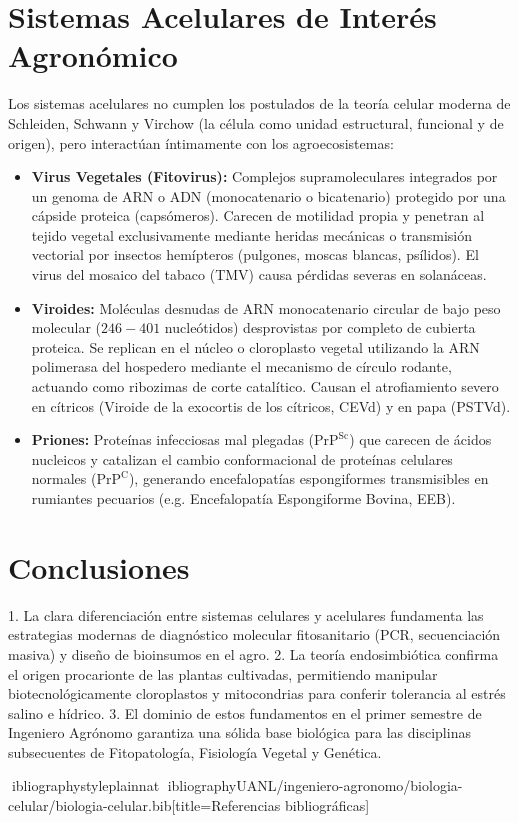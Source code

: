 \documentclass[spanish,letterpaper,oneside]{article}
\begin{document}
\section{Sistemas Acelulares de Interés Agronómico}
Los sistemas acelulares no cumplen los postulados de la teoría celular moderna de Schleiden, Schwann y Virchow (la célula como unidad estructural, funcional y de origen), pero interactúan íntimamente con los agroecosistemas:
\begin{itemize}
    \item \textbf{Virus Vegetales (Fitovirus):} Complejos supramoleculares integrados por un genoma de ARN o ADN (monocatenario o bicatenario) protegido por una cápside proteica (capsómeros). Carecen de motilidad propia y penetran al tejido vegetal exclusivamente mediante heridas mecánicas o transmisión vectorial por insectos hemípteros (pulgones, moscas blancas, psílidos). El virus del mosaico del tabaco (TMV) causa pérdidas severas en solanáceas.
    \item \textbf{Viroides:} Moléculas desnudas de ARN monocatenario circular de bajo peso molecular ($246-401$ nucleótidos) desprovistas por completo de cubierta proteica. Se replican en el núcleo o cloroplasto vegetal utilizando la ARN polimerasa del hospedero mediante el mecanismo de círculo rodante, actuando como ribozimas de corte catalítico. Causan el atrofiamiento severo en cítricos (Viroide de la exocortis de los cítricos, CEVd) y en papa (PSTVd).
    \item \textbf{Priones:} Proteínas infecciosas mal plegadas ($\text{PrP}^{\text{Sc}}$) que carecen de ácidos nucleicos y catalizan el cambio conformacional de proteínas celulares normales ($\text{PrP}^{\text{C}}$), generando encefalopatías espongiformes transmisibles en rumiantes pecuarios (e.g. Encefalopatía Espongiforme Bovina, EEB).
\end{itemize}

\section{Conclusiones}
1. La clara diferenciación entre sistemas celulares y acelulares fundamenta las estrategias modernas de diagnóstico molecular fitosanitario (PCR, secuenciación masiva) y diseño de bioinsumos en el agro.
2. La teoría endosimbiótica confirma el origen procarionte de las plantas cultivadas, permitiendo manipular biotecnológicamente cloroplastos y mitocondrias para conferir tolerancia al estrés salino e hídrico.
3. El dominio de estos fundamentos en el primer semestre de Ingeniero Agrónomo garantiza una sólida base biológica para las disciplinas subsecuentes de Fitopatología, Fisiología Vegetal y Genética.

\newpage
ibliographystyle{plainnat}
ibliography{UANL/ingeniero-agronomo/biologia-celular/biologia-celular.bib}[title={Referencias bibliográficas}]
\end{document}
